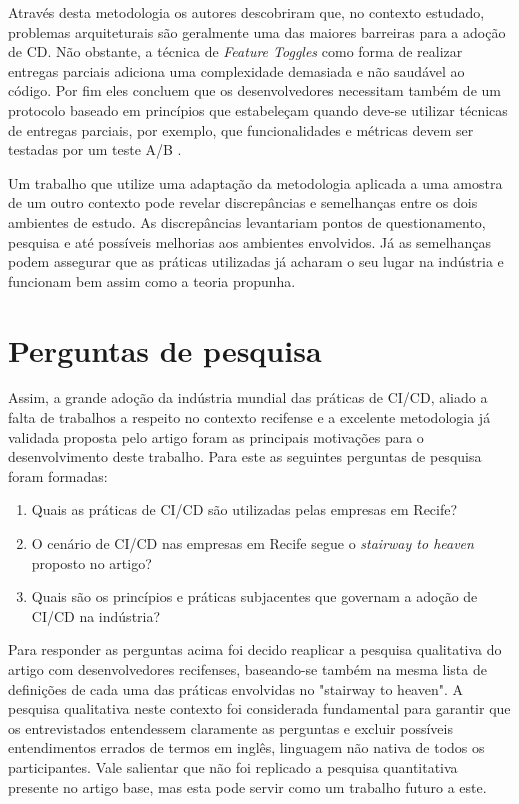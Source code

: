 Através desta metodologia os autores descobriram que, no contexto estudado, problemas arquiteturais são geralmente uma das maiores barreiras para a adoção de CD. Não obstante, a técnica de \emph{Feature Toggles} \cite{featureToggles} como forma de realizar entregas parciais adiciona uma complexidade demasiada e não saudável ao código. Por fim eles concluem que os desenvolvedores necessitam também de um protocolo baseado em princípios que estabeleçam quando deve-se utilizar técnicas de entregas parciais, por exemplo, que funcionalidades e métricas devem ser testadas por um teste A/B \cite{testsAB}.

Um trabalho que utilize uma adaptação da metodologia aplicada a uma amostra de um outro contexto pode revelar discrepâncias e semelhanças entre os dois ambientes de estudo. As discrepâncias levantariam pontos de questionamento, pesquisa e até possíveis melhorias aos ambientes envolvidos. Já as semelhanças podem assegurar que as práticas utilizadas já acharam o seu lugar na indústria e funcionam bem assim como a teoria propunha.

\section{Perguntas de pesquisa} 
Assim, a grande adoção da indústria mundial das práticas de CI/CD, aliado a falta de trabalhos a respeito no contexto recifense e a excelente metodologia já validada proposta pelo artigo \cite{empiricalStudy2016} foram as principais motivações para o desenvolvimento deste trabalho. Para este as seguintes perguntas de pesquisa foram formadas:

\begin{enumerate}
\item Quais as práticas de CI/CD são utilizadas pelas empresas em Recife?
\item O cenário de CI/CD nas empresas em Recife segue o \emph{stairway to heaven} proposto no artigo?
\item Quais são os princípios e práticas subjacentes que governam a adoção de CI/CD na indústria?
\end{enumerate}

Para responder as perguntas acima foi decido reaplicar a pesquisa qualitativa do artigo \cite{empiricalStudy2016} com desenvolvedores recifenses, baseando-se também na mesma lista de definições de cada uma das práticas envolvidas no "stairway to heaven". A pesquisa qualitativa neste contexto foi considerada fundamental para garantir que os entrevistados entendessem claramente as perguntas e excluir possíveis entendimentos errados de termos em inglês, linguagem não nativa de todos os participantes. Vale salientar que não foi replicado a pesquisa quantitativa presente no artigo base, mas esta pode servir como um trabalho futuro a este.

